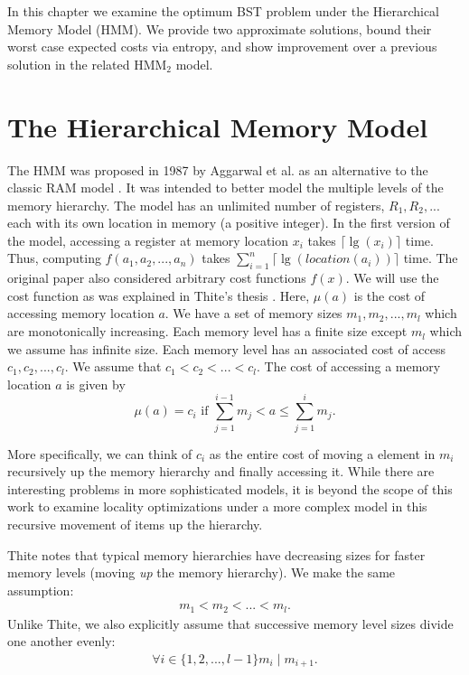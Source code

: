 \documentclass[letterpaper,12pt,titlepage,oneside,final]{book}
\theoremstyle{plain}
\begin{document}
In this chapter we examine the optimum BST problem under the Hierarchical Memory Model (HMM). We provide two approximate solutions, bound their worst case expected costs via entropy, and show improvement over a previous solution in the related HMM$_2$ model. 
 
\section{The Hierarchical Memory Model}\label{The Hierarchical Memory Model}

The HMM was proposed in 1987 by Aggarwal et al. as an alternative to the classic RAM model \cite{aggarwal1987model}. It was intended to better model the multiple levels of the memory hierarchy. The model has an unlimited number of registers, $R_1, R_2, ...$ each with its own location in memory (a positive integer). In the first version of the model, accessing a register at memory location $x_i$ takes $\lceil \lg(x_i) \rceil$ time. Thus, computing $f(a_1, a_2, ..., a_n)$ takes $\sum_{i=1}^{n} \lceil \lg(location(a_i)) \rceil$ time. The original paper also considered arbitrary cost functions $f(x)$. We will use the cost function as was explained in Thite's thesis \cite{thite2008optimum}. Here, $\mu (a)$ is the cost of accessing memory location $a$. We have a set of memory sizes $m_1, m_2, ..., m_l$ which are monotonically increasing. Each memory level has a finite size except $m_l$ which we assume has infinite size. Each memory level has an associated cost of access $c_1, c_2, ..., c_l$. We assume that $c_1 < c_2 < ... < c_l$. The cost of accessing a memory location $a$ is given by
\begin{equation}
\mu (a) = c_i \text{ if } \sum_{j = 1}^{i-1}m_j  < a \leq \sum_{j = 1}^{i}m_j.
\end{equation}

\noindent More specifically, we can think of $c_i$ as the entire cost of moving a element in $m_i$ recursively up the memory hierarchy and finally accessing it. While there are interesting problems in more sophisticated models, it is beyond the scope of this work to examine locality optimizations under a more complex model in this recursive movement of items up the hierarchy.

Thite notes that typical memory hierarchies have decreasing sizes for faster memory levels (moving \textit{up} the memory hierarchy). We make the same assumption:
\begin{align*}
m_1 < m_2 < ... < m_l.
\end{align*}
Unlike Thite, we also explicitly assume that successive memory level sizes divide one another evenly:
\begin{align*}
\forall i \in  \{1,2,...,l-1\} m_i \mid m_{i+1}.
\end{align*}
\end{document}
